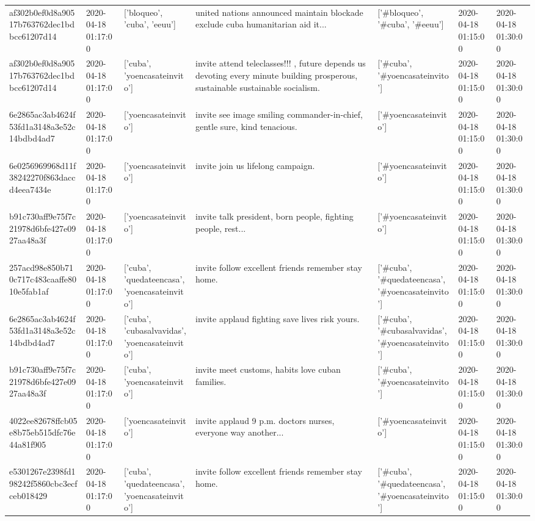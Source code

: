 \begin{tabular}{lllllll}
af302b0ef0d8a90517b763762dec1bdbcc61207d14 & 2020-04-18 01:17:00 & ['bloqueo', 'cuba', 'eeuu'] & united nations announced maintain blockade exclude cuba humanitarian aid it... & ['#bloqueo', '#cuba', '#eeuu'] & 2020-04-18 01:15:00 & 2020-04-18 01:30:00 \\
af302b0ef0d8a90517b763762dec1bdbcc61207d14 & 2020-04-18 01:17:00 & ['cuba', 'yoencasateinvito'] & invite attend teleclasses!!! , future depends us devoting every minute building prosperous, sustainable sustainable socialism. & ['#cuba', '#yoencasateinvito'] & 2020-04-18 01:15:00 & 2020-04-18 01:30:00 \\
6e2865ac3ab4624f53fd1a3148a3e52c14bdbd4ad7 & 2020-04-18 01:17:00 & ['yoencasateinvito'] & invite see image smiling commander-in-chief, gentle sure, kind tenacious. & ['#yoencasateinvito'] & 2020-04-18 01:15:00 & 2020-04-18 01:30:00 \\
6e0256969968d11f38242270f863daccd4eea7434e & 2020-04-18 01:17:00 & ['yoencasateinvito'] & invite join us lifelong campaign. & ['#yoencasateinvito'] & 2020-04-18 01:15:00 & 2020-04-18 01:30:00 \\
b91c730aff9e75f7c21978d6bfe427e0927aa48a3f & 2020-04-18 01:17:00 & ['yoencasateinvito'] & invite talk president, born people, fighting people, rest... & ['#yoencasateinvito'] & 2020-04-18 01:15:00 & 2020-04-18 01:30:00 \\
257acd98e850b710c717c483caaffe8010e5fab1af & 2020-04-18 01:17:00 & ['cuba', 'quedateencasa', 'yoencasateinvito'] & invite follow excellent friends remember stay home. & ['#cuba', '#quedateencasa', '#yoencasateinvito'] & 2020-04-18 01:15:00 & 2020-04-18 01:30:00 \\
6e2865ac3ab4624f53fd1a3148a3e52c14bdbd4ad7 & 2020-04-18 01:17:00 & ['cuba', 'cubasalvavidas', 'yoencasateinvito'] & invite applaud fighting save lives risk yours. & ['#cuba', '#cubasalvavidas', '#yoencasateinvito'] & 2020-04-18 01:15:00 & 2020-04-18 01:30:00 \\
b91c730aff9e75f7c21978d6bfe427e0927aa48a3f & 2020-04-18 01:17:00 & ['cuba', 'yoencasateinvito'] & invite meet customs, habits love cuban families. & ['#cuba', '#yoencasateinvito'] & 2020-04-18 01:15:00 & 2020-04-18 01:30:00 \\
4022ee82678ffcb05e8b75eb515dfc76e44a81f905 & 2020-04-18 01:17:00 & ['yoencasateinvito'] & invite applaud 9 p.m. doctors nurses, everyone way another... & ['#yoencasateinvito'] & 2020-04-18 01:15:00 & 2020-04-18 01:30:00 \\
e5301267e2398fd198242f5860cbc3ecfceb018429 & 2020-04-18 01:17:00 & ['cuba', 'quedateencasa', 'yoencasateinvito'] & invite follow excellent friends remember stay home. & ['#cuba', '#quedateencasa', '#yoencasateinvito'] & 2020-04-18 01:15:00 & 2020-04-18 01:30:00 \\

\end{tabular}
